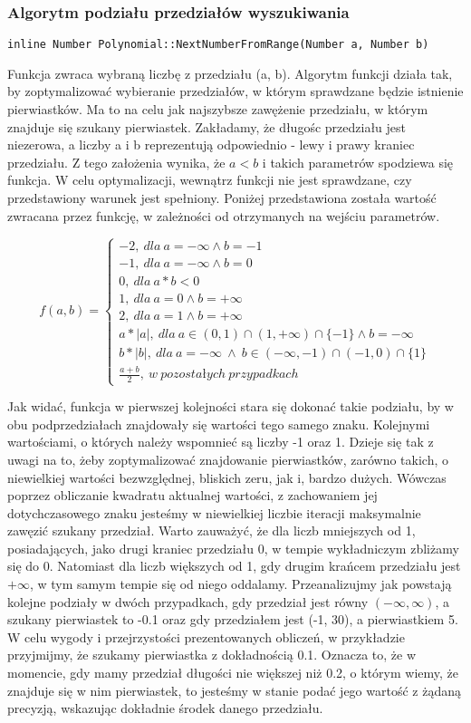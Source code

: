 \documentclass[twoside,a4paper]{book}
\begin{document}
\subsubsection{Algorytm podziału przedziałów wyszukiwania}
\begin{lstlisting}
inline Number Polynomial::NextNumberFromRange(Number a, Number b)
\end{lstlisting}
Funkcja zwraca wybraną liczbę z przedziału (a, b). Algorytm funkcji działa tak, by zoptymalizować wybieranie przedziałów, w którym sprawdzane będzie istnienie pierwiastków. Ma to na celu jak najszybsze zawężenie przedziału, w którym znajduje się szukany pierwiastek. Zakładamy, że długośc przedziału jest niezerowa, a liczby a i b reprezentują odpowiednio - lewy i prawy kraniec przedziału. Z tego założenia wynika, że $a<b$ i takich parametrów spodziewa się funkcja. W celu optymalizacji, wewnątrz funkcji nie jest sprawdzane, czy przedstawiony warunek jest spełniony. Poniżej przedstawiona została wartość zwracana przez funkcję, w zależności od otrzymanych na wejściu parametrów.

\[
f(a,b)=\left\{
\begin{array}{ll}
-2,\ dla\ a=-\infty \wedge b=-1\\
-1,\ dla\ a=-\infty \wedge b=0\\
0,\ dla\ a*b<0\\
1,\ dla\ a=0 \wedge b=+\infty\\
2,\ dla\ a=1 \wedge b=+\infty\\
a*|a|,\ dla\ a \in (0,1) \cap (1,+\infty) \cap \{-1\} \wedge b=-\infty\ \\
b*|b|,\ dla\ a=-\infty\ \wedge \ b \in (-\infty,-1) \cap (-1,0) \cap \{1\}\\
\frac{a+b}{2},\ w\ pozostałych\ przypadkach
\end{array}
\right.
\]

Jak widać, funkcja w pierwszej kolejności stara się dokonać takie podziału, by w obu podprzedziałach znajdowały się wartości tego samego znaku. Kolejnymi wartościami, o których należy wspomnieć są liczby -1 oraz 1. Dzieje się tak z uwagi na to, żeby zoptymalizować znajdowanie pierwiastków, zarówno takich, o niewielkiej wartości bezwzględnej, bliskich zeru, jak i, bardzo dużych. Wówczas poprzez obliczanie kwadratu aktualnej wartości, z zachowaniem jej dotychczasowego znaku jesteśmy w niewielkiej liczbie iteracji maksymalnie zawęzić szukany przedział. Warto zauważyć, że dla liczb mniejszych od 1, posiadających, jako drugi kraniec przedziału 0, w tempie wykładniczym zbliżamy się do 0. Natomiast dla liczb większych od 1, gdy drugim krańcem przedziału jest $+\infty$, w tym samym tempie się od niego oddalamy. Przeanalizujmy jak powstają kolejne podziały w dwóch przypadkach, gdy przedział jest równy $(-\infty,\infty)$, a szukany pierwiastek to -0.1 oraz gdy przedziałem jest (-1, 30), a pierwiastkiem 5. W celu wygody i przejrzystości prezentowanych obliczeń, w przykładzie przyjmijmy, że szukamy pierwiastka z dokładnością 0.1. Oznacza to, że w momencie, gdy mamy przedział długości nie większej niż 0.2, o którym wiemy, że znajduje się w nim pierwiastek, to jesteśmy w stanie podać jego wartość z żądaną precyzją, wskazując dokładnie środek danego przedziału.
\end{document}
